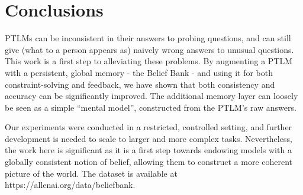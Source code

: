 \documentclass[11pt]{article}
\newcommand{\eat}[1]{}
\newcommand{\red}[1]{\textcolor{red}{#1}}
\newenvironment{ite}{                     %
     \parskip 0cm \begin{itemize} \parskip 0cm \parsep 0cm \itemsep 0cm \topsep 0cm}{
        \end{itemize}} %
\begin{document}
\eat{
\red{Mention active (targetted) question-answering by the system, rather than passive processing of an external stream of probes}
Despite these, the concept of augmenting a model with a memory layer plus reasoning is generally applicable,
allowing both neural and structured reasoning to interact. This may serve as a useful, extended architecture
for future systems.
}
\eat{
These findings are based on a very controlled experimental setup: constraint gathering is resource-bound, e.g., ConceptNET and not straight forwardly applicable to new domains. The system is based on carefully calibrated penalty scores.

In order to scale to real QA several modifications have to follow: Ideally future work will develop a system that handles queries beyond simple knowledge base triplets and is able to automatically gathers relevant constraints and queries.
}
\eat{
\begin{ite}
\item Beyond triples
\item Sources of constraints
\item Source of queries (e.g., which questions should we ask)
\item Resource-bounded constraint solving (e.g., explore just to depth D)
\end{ite}
}

\section{Conclusions}

PTLMs can be inconsistent in their answers to probing questions, and
can still give (what to a person appears as) naively wrong answers to
unusual questions. This work is a first step to alleviating these
problems.  %
By augmenting a PTLM with a persistent, global memory - the Belief Bank -
and using it for both constraint-solving and feedback, we have shown
that both consistency and accuracy can be significantly improved.
The additional memory layer can loosely be seen as a simple ``mental model'',
constructed from the PTLM's raw answers.

Our experiments were conducted in a restricted, controlled setting,
and further development is needed to scale to larger and more
complex tasks. Nevertheless, the work here is significant as it
is a first step towards endowing models with %
a globally consistent notion of belief,
allowing them to construct a more coherent picture of the world.
The dataset is available at https://allenai.org/data/beliefbank.





\end{document}
